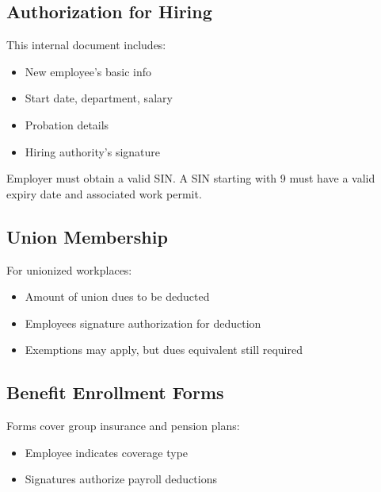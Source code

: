 \documentclass[letterpaper,10pt,english]{sphinxmanual}
\begin{document}
\subsection{Authorization for Hiring}
\label{\detokenize{onboarding_employee:authorization-for-hiring}}
\sphinxAtStartPar
This internal document includes:
\begin{itemize}
\item {} 
\sphinxAtStartPar
New employee’s basic info

\item {} 
\sphinxAtStartPar
Start date, department, salary

\item {} 
\sphinxAtStartPar
Probation details

\item {} 
\sphinxAtStartPar
Hiring authority’s signature

\end{itemize}

\sphinxAtStartPar
{} Employer must obtain a valid SIN. A SIN starting with 9 must have a valid expiry date and associated work permit.


\subsection{Union Membership}
\label{\detokenize{onboarding_employee:union-membership}}
\sphinxAtStartPar
For unionized workplaces:
\begin{itemize}
\item {} 
\sphinxAtStartPar
Amount of union dues to be deducted

\item {} 
\sphinxAtStartPar
Employees signature authorization for deduction

\item {} 
\sphinxAtStartPar
Exemptions may apply, but dues equivalent still required

\end{itemize}


\subsection{Benefit Enrollment Forms}
\label{\detokenize{onboarding_employee:benefit-enrollment-forms}}
\sphinxAtStartPar
Forms cover group insurance and pension plans:
\begin{itemize}
\item {} 
\sphinxAtStartPar
Employee indicates coverage type

\item {} 
\sphinxAtStartPar
Signatures authorize payroll deductions

\end{itemize}
\end{document}
